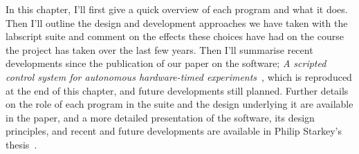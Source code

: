 In this chapter, I'll first give a quick overview of each program and what it does. Then I'll outline the design and development approaches we have taken with the labscript suite and comment on the effects these choices have had on the course the project has taken over the last few years. Then I'll summarise recent developments since the publication of our paper on the software; \emph{A scripted control system for autonomous hardware-timed experiments}~\cite{starkey_scripted_2013}, which is reproduced at the end of this chapter, and future developments still planned. Further details on the role of each program in the suite and the design underlying it are available in the paper, and a more detailed presentation of the software, its design principles, and recent and future developments are available in Philip Starkey's thesis~\cite{starkey_thesis_2018}.

